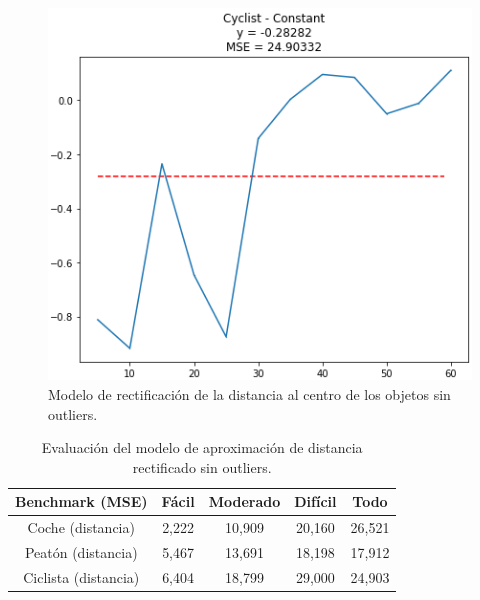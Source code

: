 \begin{figure}[H]
	\begin{minipage}{0.32\textwidth}
		\centering
		\includegraphics[width=1\linewidth]{Book/figures/6_approx_distancia/rectification2_lidar_cylist.png}
	\end{minipage}
	\caption{Modelo de rectificación de la distancia al centro de los objetos sin outliers.}
	\label{fig:Modelo de rectificación de la distancia al centro de los objetos sin outliers.}
\end{figure}

\begin{table}[H]
\centering
\begin{tabular}{|c|c|c|c|c|}
\hline
\textbf{Benchmark (MSE)} & \textbf{Fácil} & \textbf{Moderado} & \textbf{Difícil} & \textbf{Todo}\\ \hline \hline
Coche (distancia)        & 2,222          & 10,909             & 20,160       & 26,521     \\ \hline
Peatón (distancia)       & 5,467          & 13,691             & 18,198       & 17,912     \\ \hline
Ciclista (distancia)     & 6,404          & 18,799             & 29,000       & 24,903  \\ \hline
\end{tabular}
\caption{Evaluación del modelo de aproximación de distancia rectificado sin outliers.}
\label{fig:Evaluación del modelo de aproximación de distancia rectificado sin outliers.}
\end{table}

